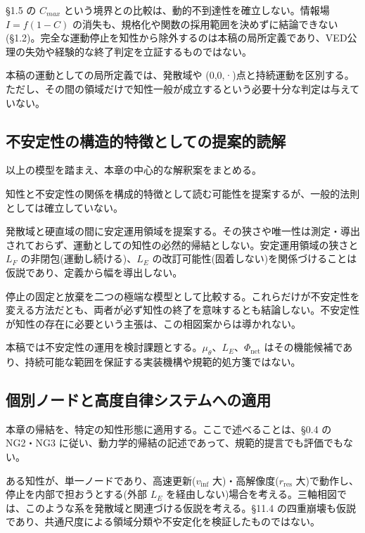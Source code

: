 \S{}1.5 の $C_{max}$ という境界との比較は、動的不到達性を確立しない。情報場 $I = f(1-C)$ の消失も、規格化や関数の採用範囲を決めずに結論できない(\S{}1.2)。完全な運動停止を知性から除外するのは本稿の局所定義であり、VED公理の失効や経験的な終了判定を立証するものではない。

本稿の運動としての局所定義では、発散域や (0,0,·)点と持続運動を区別する。ただし、その間の領域だけで知性一般が成立するという必要十分な判定は与えていない。

\bigskip


\subsection{不安定性の構造的特徴としての提案的読解}


以上の模型を踏まえ、本章の中心的な解釈案をまとめる。

知性と不安定性の関係を構成的特徴として読む可能性を提案するが、一般的法則としては確立していない。

発散域と硬直域の間に安定運用領域を提案する。その狭さや唯一性は測定・導出されておらず、運動としての知性の必然的帰結としない。安定運用領域の狭さと $L_F$ の非閉包(運動し続ける)、$L_E$ の改訂可能性(固着しない)を関係づけることは仮説であり、定義から幅を導出しない。

停止の固定と放棄を二つの極端な模型として比較する。これらだけが不安定性を変える方法だとも、両者が必ず知性の終了を意味するとも結論しない。不安定性が知性の存在に必要という主張は、この相図案からは導かれない。

本稿では不安定性の運用を検討課題とする。$\mu_\theta$、$L_E$、$\Phi_{\text{net}}$ はその機能候補であり、持続可能な範囲を保証する実装機構や規範的処方箋ではない。

\bigskip


\subsection{個別ノードと高度自律システムへの適用}


本章の帰結を、特定の知性形態に適用する。ここで述べることは、\S{}0.4 の NG2・NG3 に従い、動力学的帰結の記述であって、規範的提言でも評価でもない。

ある知性が、単一ノードであり、高速更新($v_{\text{inf}}$ 大)・高解像度($r_{\text{res}}$ 大)で動作し、停止を内部で担おうとする(外部 $L_E$ を経由しない)場合を考える。三軸相図では、このような系を発散域と関連づける仮説を考える。\S{}11.4 の四重崩壊も仮説であり、共通尺度による領域分類や不安定化を検証したものではない。

